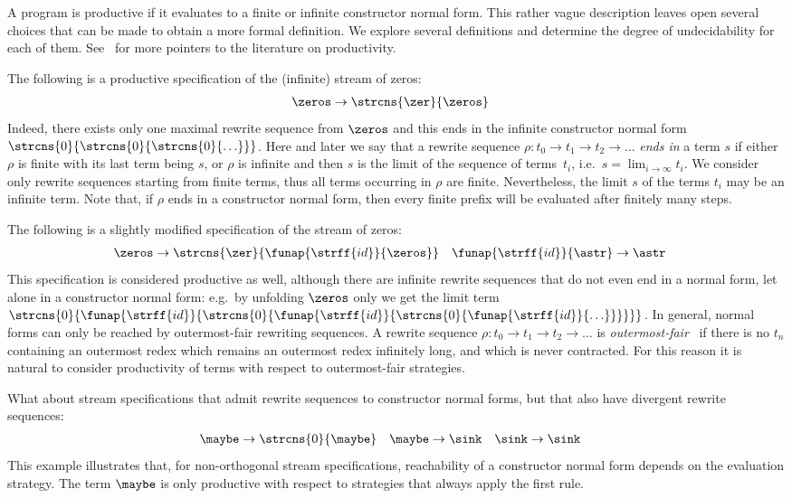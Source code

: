 A program is productive if it evaluates to a finite or infinite constructor normal form.
This rather vague description leaves open several choices 
that can be made to obtain a more formal definition. 
We explore several definitions and determine the degree of undecidability for each of them.
See~\cite{endr:grab:hend:isih:klop:2007}
for more pointers to the literature on productivity.

The following is a productive specification of the (infinite) stream of zeros:
\begin{align*}
  \zeros &\to \strcns{\zer}{\zeros}
\end{align*}
Indeed, there exists only one maximal 
rewrite sequence from $\zeros$ and this ends in the infinite constructor normal form 
$\strcns{0}{\strcns{0}{\strcns{0}{\ldots}}}$.
Here and later we say that a rewrite sequence $\rho : t_0 \to t_1 \to t_2 \to \ldots$ 
\emph{ends in} a term $s$ if either $\rho$ is finite with its last term being $s$,
or $\rho$ is infinite and then $s$ is the limit of the sequence of terms~$t_i$, i.e.\
$s = \lim_{i\to\infty}t_i$.
We consider only rewrite sequences starting from finite terms, thus all
terms occurring in $\rho$ are finite. Nevertheless, the limit $s$ of the terms $t_i$
may be an infinite term.
Note that, if $\rho$ ends in a constructor normal form, 
then every finite prefix will be evaluated after finitely many steps.

The following is a slightly modified specification of the stream of zeros:
\begin{align*}
  \zeros &\to \strcns{\zer}{\funap{\strff{id}}{\zeros}} & \funap{\strff{id}}{\astr} &\to \astr
\end{align*}
This specification is considered productive as well,
although there are infinite rewrite sequences that do not even end in a normal form,
let alone in a constructor normal form: e.g.\ by 
unfolding $\zeros$ only we get the limit term 
$\strcns{0}{\funap{\strff{id}}{\strcns{0}{\funap{\strff{id}}{\strcns{0}{\funap{\strff{id}}{\ldots}}}}}}$.
In general, normal forms can only be reached by outermost-fair rewriting sequences.
A rewrite sequence $\rho : t_0 \to t_1 \to t_2 \to \ldots$ is \emph{outermost-fair}~\cite{terese:2003}
if there is no $t_n$ containing an outermost redex which remains an outermost redex infinitely long,
and which is never contracted.
For this reason it is natural to consider productivity of terms with respect to outermost-fair strategies.

What about stream specifications that admit rewrite sequences to constructor normal forms, 
but that also have divergent rewrite sequences:
\begin{align*}
  \maybe &\to \strcns{0}{\maybe} &
  \maybe &\to \sink &
  \sink &\to \sink
\end{align*}
This example illustrates that, for non-orthogonal stream specifications,
reachability of a constructor normal form depends on the evaluation strategy.
The term $\maybe$ is only productive
with respect to strategies that always apply the first rule.

